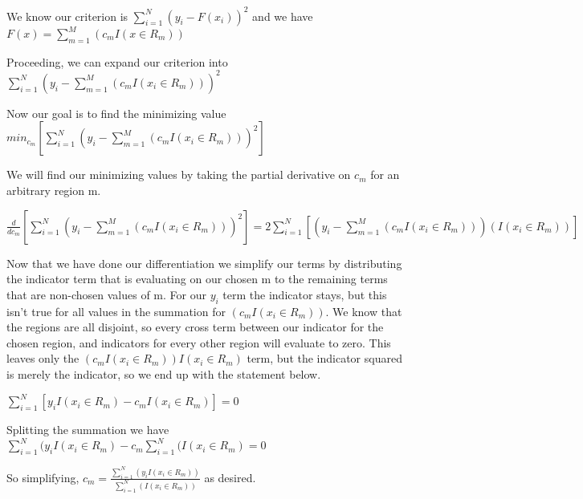 \documentclass[11pt]{article}
\begin{document}
\vspace{3 mm}
\noindent
We know our criterion is $\sum\limits_{i=1}^N (y_{i} - F(x_{i}))^2$ and we have 
$F(x) = \sum\limits_{m=1}^M (c_{m}I(x \in R_{m}))$

\vspace{3 mm}
\noindent
Proceeding, we can expand our criterion into 
$\sum\limits_{i=1}^N (y_{i} - \sum\limits_{m=1}^M (c_{m}I(x_{i} \in R_{m})))^2$

\vspace{3 mm}
\noindent
Now our goal is to find the minimizing value 
$min_{c_{m}}[\sum\limits_{i=1}^N (y_{i} - 
\sum\limits_{m=1}^M (c_{m}I(x_{i} \in R_{m})))^2]$ 

\vspace{3 mm}
\noindent
We will find our minimizing values by taking the partial derivative on $c_{m}$ 
for an arbitrary region m.

\vspace{3 mm}
\noindent
$\frac{d}{dc_{m}}[\sum\limits_{i=1}^N (y_{i} - 
\sum\limits_{m=1}^M (c_{m}I(x_{i} \in R_{m})))^2] = 
2\sum\limits_{i=1}^N [(y_{i} - \sum\limits_{m=1}^M (c_{m}I(x_{i} \in R_{m})))
(I(x_{i} \in R_{m}))]$ 

\vspace{3 mm}
\noindent
Now that we have done our differentiation we simplify our terms by distributing 
the indicator term that is evaluating on our chosen m to the remaining terms 
that are non-chosen values of m. For our $y_{i}$ term the indicator stays, but 
this isn't true for all values in the summation for 
$(c_{m}I(x_{i} \in R_{m}))$.  We know that the regions are all disjoint, so 
every cross term between our indicator for the chosen region, and indicators 
for every other region will evaluate to zero.  This leaves only the 
$(c_{m}I(x_{i} \in R_{m}))I(x_{i} \in R_{m})$ term, but the indicator squared 
is merely the indicator, so we end up with the statement below.

\vspace{3 mm}
\noindent
$\sum\limits_{i=1}^N [y_{i}I(x_{i} \in R_{m}) - c_{m}I(x_{i} \in R_{m})] = 0$ 

\vspace{3 mm}
\noindent
Splitting the summation we have 
$\sum\limits_{i=1}^N (y_{i}I(x_{i} \in R_{m}) - 
c_{m}\sum\limits_{i=1}^N (I(x_{i} \in R_{m}) = 0$

\vspace{3 mm}
\noindent
So simplifying, 
${c}_{m} = \frac{\sum\limits_{i=1}^N (y_{i} I(x_{i} \in R_{m}))}
{\sum\limits_{i=1}^N (I(x_{i} \in R_{m}))}$ 
as desired.
\end{document}
